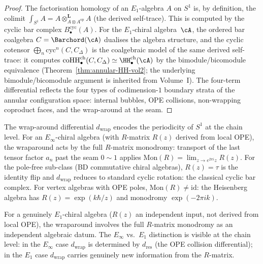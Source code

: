 \begin{proof}
The factorisation homology of an $E_1$-algebra $A$ on
$S^1$ is, by definition, the colimit
$\int_{S^1}A=A\otimes_{A\otimes A^{\mathrm{op}}}^{\mathbf{L}}A$
(the derived self-trace). This is computed by the
cyclic bar complex $B^{\mathrm{cyc}}_\bullet(A)$.
For the $E_1$-chiral algebra~$\cA$, the ordered bar
coalgebra $C=\Barchord(\cA)$ dualises the algebra
structure, and the cyclic cotensor
$\bigoplus_n\mathrm{cyc}^n(C,C_\Delta)$ is the
coalgebraic model of the same derived self-trace:
it computes
$\operatorname{coHH}_\bullet^{\mathrm{ch}}(C,C_\Delta)
\simeq\HH^{\mathrm{ch}}_\bullet(\cA)$
by the bimodule/bicomodule equivalence
(Theorem~\ref{thm:annular-HH-vol2}; the underlying
bimodule/bicomodule argument is inherited from Volume~I).
The four-term differential reflects the four types of
codimension-$1$ boundary strata of the annular
configuration space: internal bubbles, OPE collisions,
non-wrapping coproduct faces, and the wrap-around
at the seam.
\end{proof}

\begin{remark}%
\label{rem:wraparound-monodromy}%
%
%
The wrap-around differential $d_{\mathrm{wrap}}$
encodes the periodicity of $S^1$ at the chain level.
For an $E_\infty$-chiral algebra (with $R$-matrix
$R(z)$ derived from local OPE), the wraparound
acts by the full $R$-matrix monodromy: transport of
the last tensor factor $a_n$ past the seam $0\sim 1$
applies
$\mathrm{Mon}(R)=\lim_{z\to e^{2\pi i}z}R(z)$.
For the pole-free sub-class (BD commutative chiral
algebras), $R(z)=\tau$ is the identity flip
and $d_{\mathrm{wrap}}$ reduces to standard
cyclic rotation: the classical cyclic bar complex.
For vertex algebras with OPE poles,
$\mathrm{Mon}(R)\neq\mathrm{id}$: the Heisenberg algebra has $R(z)=\exp(k\hbar/z)$ and
monodromy $\exp(-2\pi i k)$.

For a genuinely $E_1$-chiral algebra ($R(z)$ an
independent input, not derived from local OPE),
the wraparound involves the full
$R$-matrix monodromy as an independent algebraic
datum. The $E_\infty$ vs.\ $E_1$ distinction is visible at the chain level: in the $E_\infty$ case
$d_{\mathrm{wrap}}$ is determined by $d_{\mathrm{res}}$
(the OPE collision differential); in the $E_1$ case
$d_{\mathrm{wrap}}$ carries genuinely new information
from the $R$-matrix.
\end{remark}

